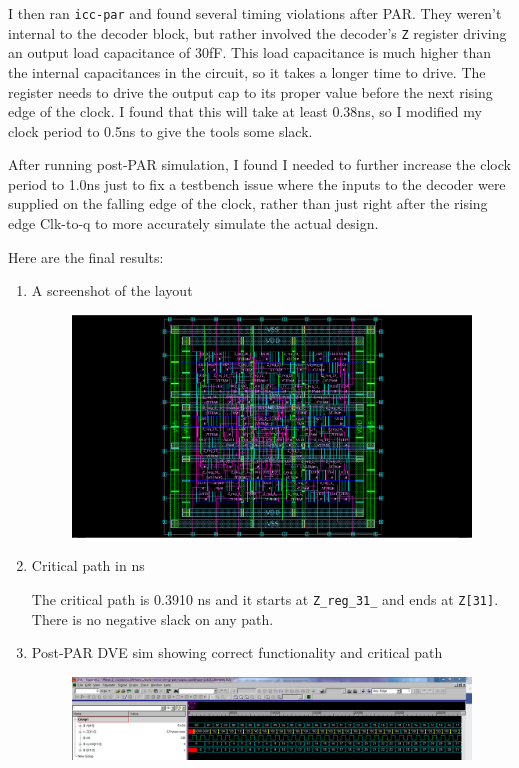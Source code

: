 \documentclass[11pt]{article}
\begin{document}
I then ran \verb|icc-par| and found several timing violations after PAR. They weren't internal to the decoder block, but rather involved the decoder's \verb|Z| register driving an output load capacitance of 30fF. This load capacitance is much higher than the internal capacitances in the circuit, so it takes a longer time to drive. The register needs to drive the output cap to its proper value before the next rising edge of the clock. I found that this will take at least 0.38ns, so I modified my clock period to 0.5ns to give the tools some slack.

After running post-PAR simulation, I found I needed to further increase the clock period to 1.0ns just to fix a testbench issue where the inputs to the decoder were supplied on the falling edge of the clock, rather than just right after the rising edge Clk-to-q to more accurately simulate the actual design.

Here are the final results:

\begin{enumerate}
	\item A screenshot of the layout
	
	\begin{figure}[H]
		\centerline{\includegraphics[width=\textwidth+2cm]{images/icc_chip_image.png}}
	\end{figure}

	\item Critical path in ns
	
	The critical path is 0.3910 ns and it starts at \verb|Z_reg_31_| and ends at \verb|Z[31]|. There is no negative slack on any path.
	
	\item Post-PAR DVE sim showing correct functionality and critical path
	
	\begin{figure}[H]
		\centerline{\includegraphics[width=\textwidth+2cm]{images/success_vcs_run.png}}
	\end{figure}
\end{enumerate}
\end{document}
